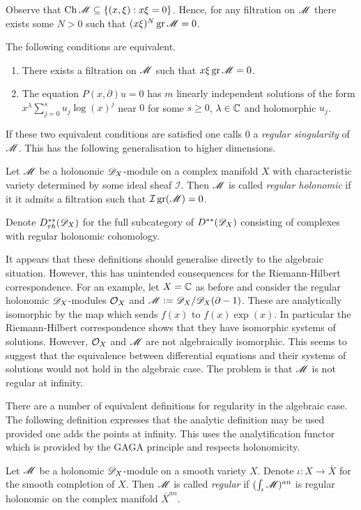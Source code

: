 Observe that $\operatorname{Ch} \mathscr{M}\subseteq \{(x,\xi): x\xi = 0\}$.
Hence, for any filtration on $\mathscr{M}$ there exists some $N>0$ such that
$(x\xi)^N \operatorname{gr}\mathscr{M} = 0 $.
\begin{proposition}{\cite[Section 5.1]{kashiwara2003d}}
  The following conditions are equivalent.
  \begin{enumerate}
    \item There exists a filtration on $\mathscr{M}$ such that $x\xi\operatorname{gr}\mathscr{M} = 0$.
    \item The equation $P(x,\partial)u=0$ has $m$ linearly independent solutions of the form $x^\lambda \sum_{j=0}^s u_j \log(x)^j $
    near $0$ for some $s\geq 0$, $\lambda \in \mathbb{C}$ and holomorphic $u_j$.
  \end{enumerate}
\end{proposition}
If these two equivalent conditions are satisfied one calls $0$ a {\it regular singularity} of $\mathscr{M}$.
This has the following generalisation to higher dimensions.
\begin{definition}
   Let $\mathscr{M}$ be a holonomic $\mathscr{D}_X$-module on a complex manifold $X$ with characteristic variety determined by some ideal sheaf $\mathcal{I}$.
   Then $\mathscr{M}$ is called {\it regular holonomic} if it it admits a filtration such that $\mathcal{I} \operatorname{gr}(\mathscr{M}) = 0$.
\end{definition}
Denote $D^{**}_{rh}(\mathscr{D}_X)$ for the full subcategory of $D^{**}(\mathscr{D}_X)$ consisting of complexes with regular holonomic cohomology.

It appears that these definitions should generalise directly to the algebraic situation.
However, this has unintended consequences for the Riemann-Hilbert correspondence.
For an example, let $X = \mathbb{C}$ as before and consider the regular holonomic $\mathscr{D}_X$-modules $\mathcal{O}_X$ and $\mathscr{M} := \mathscr{D}_X/\mathscr{D}_X(\partial - 1)$.
These are analytically isomorphic by the map which sends $f(x)$ to $f(x)\exp(x)$.
In particular the Riemann-Hilbert correspondence shows that they have isomorphic systems of solutions.
However, $\mathcal{O}_X$ and $\mathscr{M}$ are not algebraically isomorphic.
This seems to suggest that the equivalence between differential equations and their systems of solutions would not hold in the algebraic case.
The problem is that $\mathscr{M}$ is not regular at infinity.

There are a number of equivalent definitions for regularity in the algebraic case.
The following definition expresses that the analytic definition may be used provided one adds the points at infinity.
This uses the analytification functor which is provided by the GAGA principle and respects holonomicity.
\begin{definition}
  Let $\mathscr{M}$ be a holonomic $\mathscr{D}_X$-module on a smooth variety $X$.
  Denote $\iota:X \to \overline{X}$ for the smooth completion of $X$.
  Then $\mathscr{M}$ is called {\it regular} if $(\int_\iota \mathscr{M})^{an}$ is regular holonomic on the complex manifold $\overline{X}^{an}$.
\end{definition}
